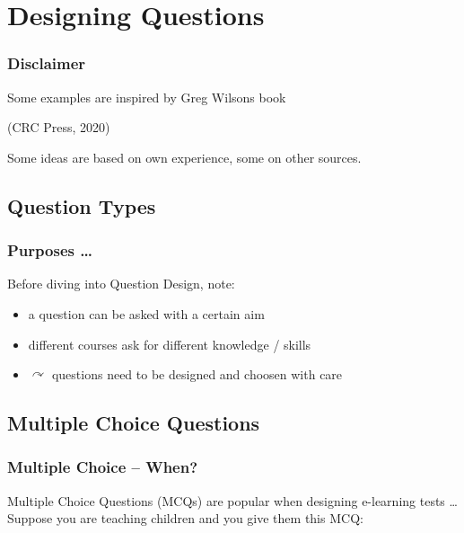 \section[Designing Questions]{Designing Questions}

\begin{frame}
  \frametitle{Disclaimer}
  Some examples are inspired by Greg Wilsons book
 \begin{center}
   (CRC Press, 2020)
 \end{center}
 Some ideas are based on own experience, some on other sources.
\end{frame}

\subsection{Question Types}

\begin{frame}
  \frametitle{Purposes \ldots}
  Before diving into Question Design, note:
  \begin{itemize}
    \item a question can be asked with a certain aim
    \item different courses ask for different knowledge / skills
    \item $\curvearrowright$ questions need to be designed and choosen with care
  \end{itemize}
\end{frame}


\subsection{Multiple Choice Questions}

\begin{frame}
 \frametitle{Multiple Choice -- When?}

 Multiple Choice Questions (MCQs) are popular when designing e-learning tests \ldots\vspace{-1em}
 \pause
 \newline
 \pause
 Suppose you are teaching children and you give them this MCQ:
 \vspace*{-0.3cm}
\end{frame}


